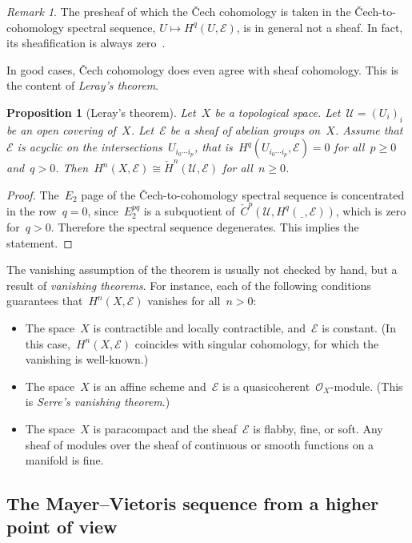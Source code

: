 \documentclass[10pt]{amsart}
\theoremstyle{definition}
\theoremstyle{plain}
\newtheorem{prop}[defn]{Proposition}
\theoremstyle{remark}
\newtheorem{rem}[defn]{Remark}
\newcommand{\E}{\mathcal{E}}
\renewcommand{\O}{\mathcal{O}}
\newcommand{\U}{\mathcal{U}}
\newcommand{\spot}{\underline{\ \ }}
\newcommand{\stackhref}[1]{\href{http://stacks.math.columbia.edu/tag/#1}{#1}}
\begin{document}
\begin{rem}The presheaf of which the Čech cohomology is taken in the
Čech-to-cohomology spectral sequence, $U \mapsto H^q(U,\E)$, is in general not
a sheaf. In fact, its sheafification is always
zero~\cite[Tag~\stackhref{03BA}]{stacks-project}.\end{rem}

In good cases, Čech cohomology does even agree with sheaf cohomology. This is
the content of \emph{Leray's theorem}.

\begin{prop}[Leray's theorem]Let~$X$ be a topological space. Let~$\U = (U_i)_i$ be an open
covering of~$X$. Let~$\E$ be a sheaf of abelian groups
on~$X$. Assume that~$\E$ is acyclic on the intersections~$U_{i_0 \cdots i_p}$,
that is~$H^q(U_{i_0 \cdots i_p}, \E) = 0$ for all~$p \geq 0$ and~$q > 0$.
Then~$H^n(X,\E) \cong \check H^n(\U,\E)$ for all~$n \geq 0$.\end{prop}

\begin{proof}The~$E_2$ page of the Čech-to-cohomology spectral sequence is
concentrated in the row~$q = 0$, since~$E_2^{pq}$ is a subquotient of~$\check
C^p(\U, H^q(\spot,\E))$, which is zero for~$q > 0$. Therefore the spectral
sequence degenerates. This implies the statement.
\end{proof}

The vanishing assumption of the theorem is usually not checked by hand, but a
result of \emph{vanishing theorems}. For instance, each of the following
conditions guarantees that~$H^n(X,\E)$ vanishes for all~$n > 0$:
\begin{itemize}
\item The space~$X$ is contractible and locally contractible, and~$\E$ is
constant. (In this case,~$H^n(X,\E)$ coincides with singular cohomology, for
which the vanishing is well-known.)
\item The space~$X$ is an affine scheme and~$\E$ is a
quasicoherent~$\O_X$-module. (This is \emph{Serre's vanishing theorem}.)
\item The space~$X$ is paracompact and the sheaf~$\E$ is flabby, fine, or soft.
Any sheaf of modules over the sheaf of continuous or smooth functions on a
manifold is fine.
\end{itemize}


\subsection{The Mayer--Vietoris sequence from a higher point of view}
\end{document}
